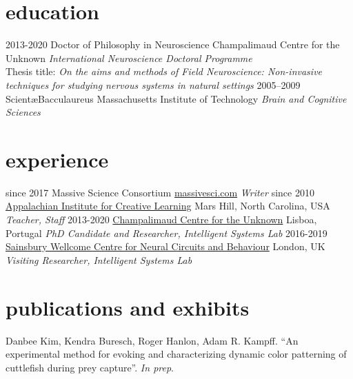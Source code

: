\documentclass[]{friggeri-cv}
\begin{document}
\section{education}

\begin{entrylist}
  \entry
    {2013-2020}
    {Doctor of Philosophy in Neuroscience}
    {Champalimaud Centre for the Unknown}
    {\emph{International Neuroscience Doctoral Programme}\\
    Thesis title: \emph{On the aims and methods of Field Neuroscience: Non-invasive techniques for studying nervous systems in natural settings}}
  \entry
    {2005–2009}
    {Scient\ae Bacculaureus}
    {Massachusetts Institute of Technology}
    {\emph{Brain and Cognitive Sciences}}
\end{entrylist}

\section{experience}

\begin{entrylist}
  \entry
    {since 2017}
    {Massive Science Consortium}
    {\href{massivesci.com}{massivesci.com}}
    {\emph{Writer}}
  \entry
    {since 2010}
    {\href{http://www.appalachianinstitute.org/}{Appalachian Institute for Creative Learning}}
    {Mars Hill, North Carolina, USA}
    {\emph{Teacher, Staff}}
  \entry
    {2013-2020}
    {\href{http://neuro.fchampalimaud.org/en/research/investigators/research-groups/group/Kampff/}{Champalimaud Centre for the Unknown}}
    {Lisboa, Portugal}
    {\emph{PhD Candidate and Researcher, Intelligent Systems Lab}}
  \entry
    {2016-2019}
    {\href{https://www.ucl.ac.uk/swc/}{Sainsbury Wellcome Centre for Neural Circuits and Behaviour}}
    {London, UK}
    {\emph{Visiting Researcher, Intelligent Systems Lab}}
\end{entrylist}

\section{publications and exhibits}

Danbee Kim, Kendra Buresch, Roger Hanlon, Adam R. Kampff. ``An experimental method for evoking and characterizing dynamic color patterning of cuttlefish during prey capture''. \emph{In prep}.
\end{document}
